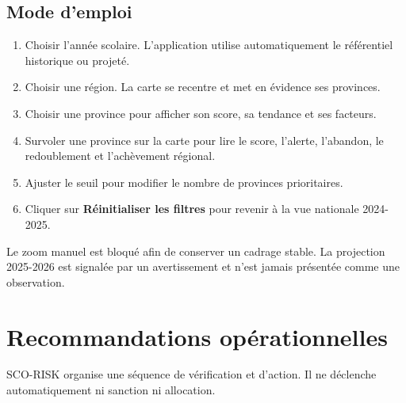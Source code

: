 \documentclass[12pt,a4paper]{article}
\begin{document}
\begin{center}
\end{center}

\subsection{Mode d'emploi}
\begin{enumerate}
  \item Choisir l'année scolaire. L'application utilise automatiquement le référentiel historique ou projeté.
  \item Choisir une région. La carte se recentre et met en évidence ses provinces.
  \item Choisir une province pour afficher son score, sa tendance et ses facteurs.
  \item Survoler une province sur la carte pour lire le score, l'alerte, l'abandon, le redoublement et l'achèvement régional.
  \item Ajuster le seuil pour modifier le nombre de provinces prioritaires.
  \item Cliquer sur \textbf{Réinitialiser les filtres} pour revenir à la vue nationale 2024-2025.
\end{enumerate}

Le zoom manuel est bloqué afin de conserver un cadrage stable. La projection 2025-2026 est signalée par un avertissement et n'est jamais présentée comme une observation.
\clearpage
\thispagestyle{fancy}

\section{Recommandations opérationnelles}
SCO-RISK organise une séquence de vérification et d'action. Il ne déclenche automatiquement ni sanction ni allocation.
\end{document}
